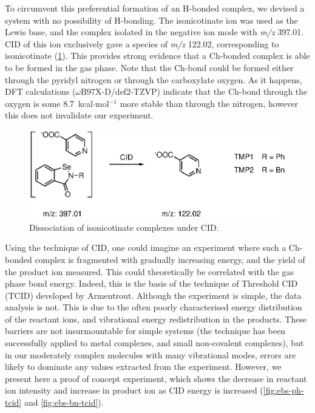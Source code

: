\begin{refsection}
To circumvent this preferential formation of an H-bonded complex, we devised a system with no possibility of H-bonding.
The isonicotinate ion was used as the Lewis base, and the complex isolated in the negative ion mode with \textit{m/z} 397.01.
CID of this ion exclusively gave a species of \textit{m/z} 122.02, corresponding to isonicotinate (\cref{fig:neg-esi-ms}).
This provides strong evidence that a Ch-bonded complex is able to be formed in the gas phase.
Note that the Ch-bond could be formed either through the pyridyl nitrogen or through the carboxylate oxygen.
As it happens, DFT calculations ($\omega$B97X-D/def2-TZVP) indicate that the Ch-bond through the oxygen is some 8.7~kcal$\cdot$mol$^{-1}$ more stable than through the nitrogen, however this does not invalidate our experiment.


\begin{figure}
    \centering
    \includegraphics[scale=0.74]{Figures/neg-esi-ms.eps}
    \caption[Negative mode ESI of isonicotinate complexes.]{Dissociation of isonicotinate complexes under CID.}\label{fig:neg-esi-ms}
\end{figure}

Using the technique of CID, one could imagine an experiment where such a Ch-bonded complex is fragmented with gradually increasing energy, and the yield of the product ion measured.
This could theoretically be correlated with the gas phase bond energy.
Indeed, this is the basis of the technique of Threshold CID (TCID) developed by Armentrout.\autocite{Armentrout2003,Rodgers2000,Narancic2007}
Although the experiment is simple, the data analysis is not.
This is due to the often poorly characterised energy distribution of the reactant ions, and vibrational energy redistribution in the products.
These barriers are not insurmountable for simple systems (the technique has been successfully applied to metal complexes, and small non-covalent complexes), but in our moderately complex molecules with many vibrational modes, errors are likely to dominate any values extracted from the experiment.
However, we present here a proof of concept experiment, which shows the decrease in reactant ion intensity and increase in product ion as CID energy is increased (\cref{fig:ebs-ph-tcid} and \cref{fig:ebs-bn-tcid}).


\end{refsection}
